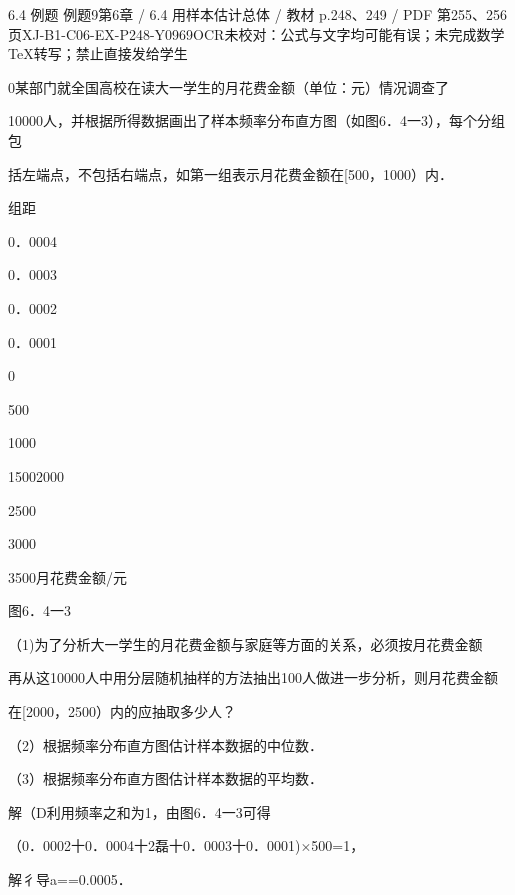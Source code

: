 \begin{bankitem}{6.4 例题 例题9}{第6章 / 6.4 用样本估计总体 / 教材 p.248、249 / PDF 第255、256页}{XJ-B1-C06-EX-P248-Y0969}{OCR未校对：公式与文字均可能有误；未完成数学TeX转写；禁止直接发给学生}
\begin{ocrdraft}
\par
0某部门就全国高校在读大一学生的月花费金额（单位：元）情况调查了
\par
10000人，并根据所得数据画出了样本频率分布直方图（如图6．4一3），每个分组包
\par
括左端点，不包括右端点，如第一组表示月花费金额在[500，1000）内．
\par
组距
\par
0．0004
\par
0．0003
\par
0．0002
\par
0．0001
\par
0
\par
500
\par
1000
\par
15002000
\par
2500
\par
3000
\par
3500月花费金额/元
\par
图6．4一3
\par
（1)为了分析大一学生的月花费金额与家庭等方面的关系，必须按月花费金额
\par
再从这10000人中用分层随机抽样的方法抽出100人做进一步分析，则月花费金额
\par
在[2000，2500）内的应抽取多少人？
\par
（2）根据频率分布直方图估计样本数据的中位数．
\par
[教材p.249 / PDF第256页]
\par
（3）根据频率分布直方图估计样本数据的平均数．
\par
解（D利用频率之和为1，由图6．4一3可得
\par
（0．0002十0．0004十2磊十0．0003十0．0001)\ensuremath{\times}500=1，
\par
解彳导a==0.0005．
\par

\end{ocrdraft}
\end{bankitem}
